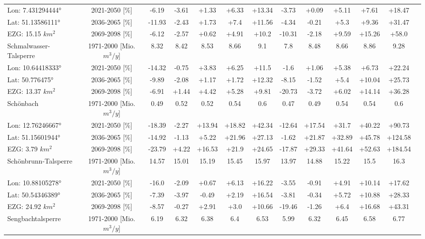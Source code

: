 \begin{longtable}{@{\extracolsep{\fill}}lc|ccccc||cccccc}
\cline{2-13} 
Lon: 7.431294444° & 2021-2050 [\%]  & -6.19 & -3.61 & +1.33 & +6.33 & +13.34 & -3.73 & +0.09 & +5.11 & +7.61 & +18.47 & \\ 
Lat: 51.13586111° & 2036-2065 [\%]  & -11.93 & -2.43 & +1.73 & +7.4 & +11.56 & -4.34 & -0.21 & +5.3 & +9.36 & +31.47 & \\ 
EZG: 15.15 $km^2$ & 2069-2098 [\%]  & -6.12 & -2.57 & +0.62 & +4.91 & +10.2 & -10.31 & -2.18 & +9.59 & +15.26 & +58.0 & \\ 
\hline 
Schmalwasser-Talsperre & 1971-2000 [Mio. $m^3/y$]  & 8.32 & 8.42 & 8.53 & 8.66 & 9.1 & 7.8 & 8.48 & 8.66 & 8.86 & 9.28 & \\ 
\cline{2-13} 
Lon: 10.64418333° & 2021-2050 [\%]  & -14.32 & -0.75 & +3.83 & +6.25 & +11.5 & -1.6 & +1.06 & +5.38 & +6.73 & +22.24 & \\ 
Lat: 50.776475° & 2036-2065 [\%]  & -9.89 & -2.08 & +1.17 & +1.72 & +12.32 & -8.15 & -1.52 & +5.4 & +10.04 & +25.73 & \\ 
EZG: 13.37 $km^2$ & 2069-2098 [\%]  & -6.91 & +1.44 & +4.42 & +5.28 & +9.81 & -20.73 & -3.72 & +6.02 & +14.14 & +36.28 & \\ 
\hline 
Schönbach & 1971-2000 [Mio. $m^3/y$]  & 0.49 & 0.52 & 0.52 & 0.54 & 0.6 & 0.47 & 0.49 & 0.54 & 0.54 & 0.6 & \\ 
\cline{2-13} 
Lon: 12.76246667° & 2021-2050 [\%]  & -18.39 & -2.27 & +13.94 & +18.82 & +42.34 & -12.64 & +17.54 & +31.7 & +40.22 & +90.73 & \\ 
Lat: 51.15601944° & 2036-2065 [\%]  & -14.92 & -1.13 & +5.22 & +21.96 & +27.13 & -1.62 & +21.87 & +32.89 & +45.78 & +124.58 & \\ 
EZG: 3.79 $km^2$ & 2069-2098 [\%]  & -23.79 & +4.22 & +16.53 & +21.9 & +24.65 & -17.87 & +29.33 & +41.64 & +52.63 & +184.54 & \\ 
\hline 
Schönbrunn-Talsperre & 1971-2000 [Mio. $m^3/y$]  & 14.57 & 15.01 & 15.19 & 15.45 & 15.97 & 13.97 & 14.88 & 15.22 & 15.5 & 16.3 & \\ 
\cline{2-13} 
Lon: 10.88105278° & 2021-2050 [\%]  & -16.0 & -2.09 & +0.67 & +6.13 & +16.22 & -3.55 & -0.91 & +4.91 & +10.14 & +17.62 & \\ 
Lat: 50.54346389° & 2036-2065 [\%]  & -7.39 & -3.97 & -0.49 & +2.19 & +16.54 & -3.81 & -0.34 & +5.72 & +10.88 & +28.33 & \\ 
EZG: 24.92 $km^2$ & 2069-2098 [\%]  & -8.57 & -0.27 & +2.91 & +3.0 & +10.66 & -19.46 & -1.26 & +6.4 & +16.68 & +43.31 & \\ 
\hline 
Sengbachtalsperre & 1971-2000 [Mio. $m^3/y$]  & 6.19 & 6.32 & 6.38 & 6.4 & 6.53 & 5.99 & 6.32 & 6.45 & 6.58 & 6.77 & \\ 

\end{longtable}
